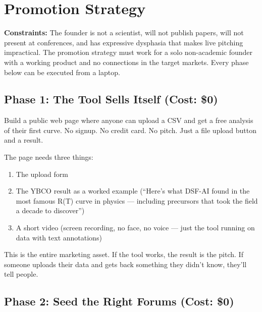 \documentclass[11pt,letterpaper]{article}
\begin{document}
\section{Promotion Strategy}

\textbf{Constraints:} The founder is not a scientist, will not publish
papers, will not present at conferences, and has expressive dysphasia
that makes live pitching impractical. The promotion strategy must work
for a solo non-academic founder with a working product and no
connections in the target markets. Every phase below can be executed
from a laptop.

\subsection{Phase 1: The Tool Sells Itself (Cost: \$0)}

Build a public web page where anyone can upload a CSV and get a free
analysis of their first curve. No signup. No credit card. No pitch.
Just a file upload button and a result.

The page needs three things:
\begin{enumerate}
  \item The upload form
  \item The YBCO result as a worked example (``Here's what DSF-AI
    found in the most famous R(T) curve in physics --- including
    precursors that took the field a decade to discover'')
  \item A short video (screen recording, no face, no voice ---
    just the tool running on data with text annotations)
\end{enumerate}

This is the entire marketing asset. If the tool works, the result
is the pitch. If someone uploads their data and gets back something
they didn't know, they'll tell people.

\subsection{Phase 2: Seed the Right Forums (Cost: \$0)}
\end{document}
